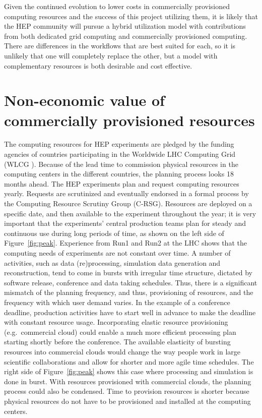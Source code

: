 \documentclass[twocolumn]{svjour3}          %
\begin{document}
Given the continued evolution to lower costs in commercially provisioned computing resources and the success of this project utilizing them, it is likely that the HEP community will pursue a hybrid utilization model with contributions from both dedicated grid computing and commercially provisioned computing. There are differences in the workflows that are best suited for each, so it is unlikely that one will completely replace the other, but a model with complementary resources is both desirable and cost effective.

\section{Non-economic value of commercially provisioned resources}

The computing resources for HEP experiments are pledged by the funding agencies of countries participating in the Worldwide LHC Computing Grid (WLCG \cite{WLCG}).
Because of the lead time to commission physical resources in the computing centers in the different countries, the planning process looks 18 months ahead.
The HEP experiments plan and request computing resources yearly. Requests are scrutinized and eventually endorsed in a formal process by the Computing Resource Scrutiny Group (C-RSG).
Resources are deployed on a specific date, and then available to the experiment throughout the year; it is very important that the experiments'
central production teams plan for steady and continuous use during long periods of time,
as shown on the left side of Figure~\ref{fig:peak}. Experience from Run1 and Run2 at the LHC shows that the computing needs of experiments are not constant over time.
A number of activities, such as data (re)processing, simulation data generation and reconstruction, tend to come in bursts with irregular time structure, dictated by software release, conference and data taking schedules. Thus, there is a significant mismatch of the planning frequency, and thus, provisioning of resources, and the frequency with which user demand varies. In the example of a conference deadline, production activities have to start well in advance to make the deadline with constant resource usage.   Incorporating elastic resource provisioning (e.g.\ commercial cloud) could enable a much more efficient processing plan starting shortly before the conference. The available elasticity of bursting resources into commercial clouds would change the way people work in large scientific collaborations and allow for shorter and more agile time schedules. The right side of Figure~\ref{fig:peak} shows this case where processing and simulation is done in burst. With resources provisioned with commercial clouds, the planning process could also be condensed. Time to provision resources is shorter because physical resources do not have to be provisioned and installed at the computing centers.
\end{document}
